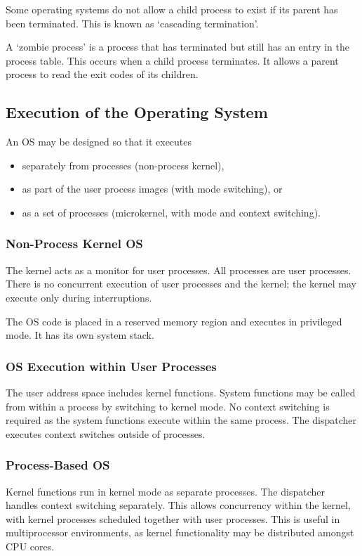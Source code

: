 Some operating systems do not allow a child process to exist if its parent has been terminated.
This is known as `cascading termination'.

A `zombie process' is a process that has terminated but still has an entry in the process table.
This occurs when a child process terminates.
It allows a parent process to read the exit codes of its children.

\subsection{Execution of the Operating System}

An OS may be designed so that it executes
\begin{itemize}
  \item separately from processes (non-process kernel),
  \item as part of the user process images (with mode switching), or
  \item as a set of processes (microkernel, with mode and context switching).
\end{itemize}

\subsubsection{Non-Process Kernel OS}

The kernel acts as a monitor for user processes.
All processes are user processes.
There is no concurrent execution of user processes and the kernel; the kernel may execute only during interruptions.

The OS code is placed in a reserved memory region and executes in privileged mode.
It has its own system stack.

\subsubsection{OS Execution within User Processes}

The user address space includes kernel functions.
System functions may be called from within a process by switching to kernel mode.
No context switching is required as the system functions execute within the same process.
The dispatcher executes context switches outside of processes.

\subsubsection{Process-Based OS}

Kernel functions run in kernel mode as separate processes.
The dispatcher handles context switching separately.
This allows concurrency within the kernel, with kernel processes scheduled together with user processes.
This is useful in multiprocessor environments, as kernel functionality may be distributed amongst CPU cores.
